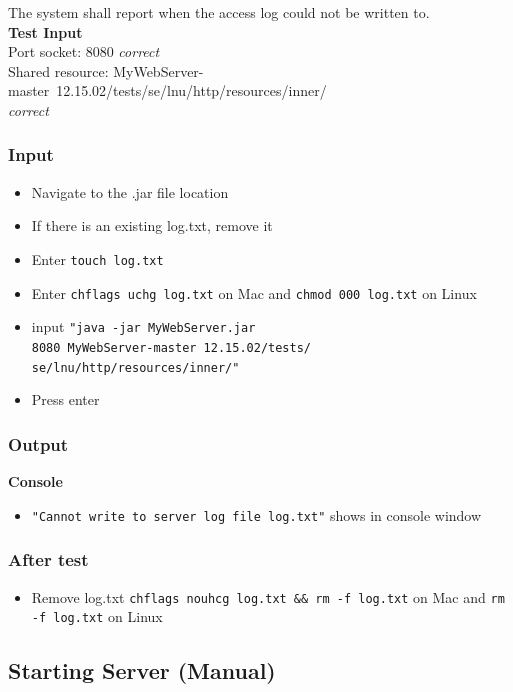 \documentclass[a4paper, 12pt]{article}
\begin{document}
The system shall report when the access log could not be written to.\\
\textbf{Test Input} \\ Port socket: 8080 \textit{correct} \\ Shared resource: MyWebServer-master\ 12.15.02/tests/se/lnu/http/resources/inner/ \\ \textit{correct}
 
\subsubsection{Input}
\begin{itemize}
\item Navigate to the .jar file location
\item If there is an existing log.txt, remove it
\item Enter \texttt{touch log.txt}
\item Enter \texttt{chflags uchg log.txt} on Mac and \texttt{chmod 000 log.txt} on Linux
\item input \texttt{"java -jar MyWebServer.jar \\ 8080 MyWebServer-master\ 12.15.02/tests/\\se/lnu/http/resources/inner/"}
\item Press enter
\end{itemize} 

\subsubsection{Output}
\textbf{Console}
\begin{itemize}
\item \texttt{"Cannot write to server log file log.txt"} shows in console window
\end{itemize}

\subsubsection{After test}
\begin{itemize}
\item Remove log.txt \texttt{chflags nouhcg log.txt \&\& rm -f log.txt} on Mac and \texttt{rm -f log.txt} on Linux
\end{itemize}

\subsection{Starting Server (Manual)}
\end{document}
